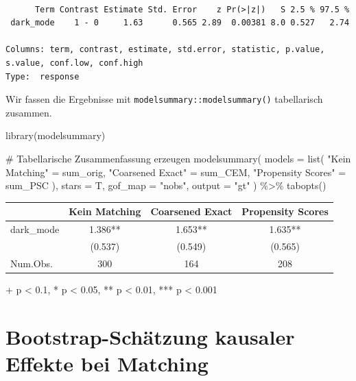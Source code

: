 \documentclass[
  a4paper,
  DIV=11,
  oneside]{scrreprt}
\newenvironment{Shaded}{\begin{snugshade}}{\end{snugshade}}
\newcommand{\AttributeTok}[1]{\textcolor[rgb]{0.40,0.45,0.13}{#1}}
\newcommand{\CommentTok}[1]{\textcolor[rgb]{0.37,0.37,0.37}{#1}}
\newcommand{\FunctionTok}[1]{\textcolor[rgb]{0.28,0.35,0.67}{#1}}
\newcommand{\NormalTok}[1]{\textcolor[rgb]{0.00,0.23,0.31}{#1}}
\newcommand{\OtherTok}[1]{\textcolor[rgb]{0.00,0.23,0.31}{#1}}
\newcommand{\SpecialCharTok}[1]{\textcolor[rgb]{0.37,0.37,0.37}{#1}}
\newcommand{\StringTok}[1]{\textcolor[rgb]{0.13,0.47,0.30}{#1}}
\begin{document}
\begin{verbatim}

      Term Contrast Estimate Std. Error    z Pr(>|z|)   S 2.5 % 97.5 %
 dark_mode    1 - 0     1.63      0.565 2.89  0.00381 8.0 0.527   2.74

Columns: term, contrast, estimate, std.error, statistic, p.value, s.value, conf.low, conf.high 
Type:  response 
\end{verbatim}

Wir fassen die Ergebnisse mit \texttt{modelsummary::modelsummary()}
tabellarisch zusammen.

\begin{Shaded}
\begin{Highlighting}[]
\FunctionTok{library}\NormalTok{(modelsummary)}

\CommentTok{\# Tabellarische Zusammenfassung erzeugen}
\FunctionTok{modelsummary}\NormalTok{(}
  \AttributeTok{models =} \FunctionTok{list}\NormalTok{(}
   \StringTok{"Kein Matching"} \OtherTok{=}\NormalTok{ sum\_orig, }
   \StringTok{"Coarsened Exact"} \OtherTok{=}\NormalTok{ sum\_CEM, }
   \StringTok{"Propensity Scores"} \OtherTok{=}\NormalTok{ sum\_PSC}
\NormalTok{  ),}
  \AttributeTok{stars =}\NormalTok{ T, }
  \AttributeTok{gof\_map =} \StringTok{"nobs"}\NormalTok{, }
  \AttributeTok{output =} \StringTok{"gt"}
\NormalTok{) }\SpecialCharTok{\%\textgreater{}\%}
  \FunctionTok{tabopts}\NormalTok{()}
\end{Highlighting}
\end{Shaded}

\setlength{\LTpost}{0mm}
\begin{longtable*}{lccc}
\toprule
  & Kein Matching & Coarsened Exact & Propensity Scores \\ 
\midrule\addlinespace[2.5pt]
dark\_mode & 1.386** & 1.653** & 1.635** \\ 
 & (0.537) & (0.549) & (0.565) \\ 
Num.Obs. & 300 & 164 & 208 \\ 
\bottomrule
\end{longtable*}
\begin{minipage}{\linewidth}
+ p < 0.1, * p < 0.05, ** p < 0.01, *** p < 0.001\\
\end{minipage}

\section{Bootstrap-Schätzung kausaler Effekte bei
Matching}\label{sec-bootmatching}
\end{document}
